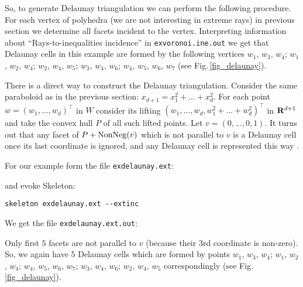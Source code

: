 \documentclass{article}
\newcommand{\Skeleton}{{\sc Skeleton}\xspace}
\newcommand{\RR}{{\rm\bf R}}
\newcommand{\NonNeg}{\mathop{\rm NonNeg}\nolimits}
\newcommand{\transpose}{^{\top}}
\begin{document}
So, to generate Delaunay triangulation we can perform the following procedure.
For each vertex of polyhedra (we are not interesting in extreme rays) in previous section
we determine all facets incident to the vertex.
Interpreting information about ``Rays-to-inequalities incidence'' in \verb$exvoronoi.ine.out$
we get that Delaunay cells in this example are formed by the following
vertices 
$w_1$, $w_3$, $w_4$;
$w_1$, $w_2$, $w_4$;
$w_2$, $w_4$, $w_5$;
$w_3$, $w_4$, $w_6$;
$w_4$, $w_5$, $w_6$, $w_7$ (see Fig.\,\ref{fig_delaunay}).

There is a direct way to construct the Delaunay triangulation. Consider the
same paraboloid as in the previous section: $x_{d+1} = x_1^2+\dots+x_d^2$.
For each point $w=(w_1,\dots,w_d)\transpose$ in $W$ consider its lifting
$(w_1,\dots,w_d,w_1^2+\dots+w_d^2)\transpose$ in $\RR^{d+1}$ and take the
convex hull $P$ of all such lifted points. Let $v=(0,\dots,0,1)$. It turns
out that any facet of $P+\NonNeg(v)$ which is not parallel to $v$ is a
Delaunay cell once its last coordinate is ignored, and any Delaunay cell is
represented this way \cite{Fukuda2004}.

For our example form the file \verb$exdelaunay.ext$:

and evoke \Skeleton:
\begin{verbatim}
skeleton exdelaunay.ext --extinc
\end{verbatim}
We get the file \verb$exdelaunay.ext.out$:

Only first $5$ facets are not parallel to $v$ (because their 3rd coordinate is non-zero).
So, we again have $5$ Delaunay cells which are formed by points
$w_1$, $w_3$, $w_4$;
$w_1$, $w_2$, $w_4$;
$w_4$, $w_5$, $w_6$, $w_7$;
$w_3$, $w_4$, $w_6$;
$w_2$, $w_4$, $w_5$
correspondingly  (see Fig.\,\ref{fig_delaunay}).




\end{document}
